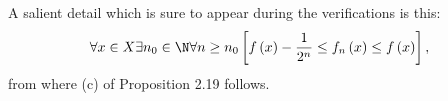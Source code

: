 \documentclass[pmath450]{subfiles}
\begin{document}
    \placeqed[Exercise]

    \np A salient detail which is sure to appear during the verifications is this: 
    \begin{equation*}
        \forall x\in X\exists n_0\in\N\forall n\geq n_0 \left[ f\left( x \right)-\frac{1}{2^n}\leq f_n\left( x \right)\leq f\left( x \right) \right],
    \end{equation*}
    from where (c) of Proposition 2.19 follows.
\end{document}
